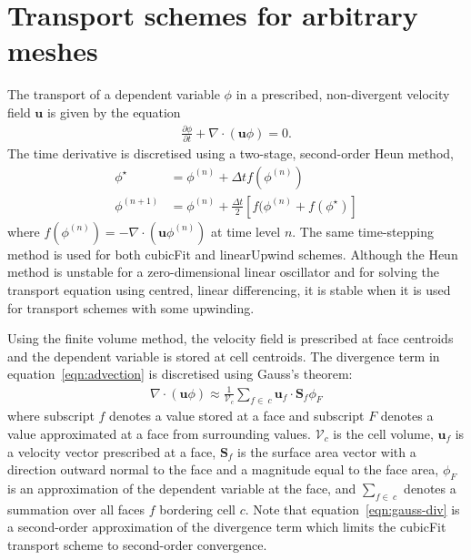 \section{Transport schemes for arbitrary meshes}
\label{sec:transport}
The transport of a dependent variable $\phi$ in a prescribed, non-divergent velocity field $\mathbf{u}$ is given by the equation		
\begin{align}		
	\frac{\partial \phi}{\partial t} + \nabla \cdot \left( \mathbf{u} \phi \right) = 0 \text{.} \label{eqn:advection}		
\end{align}
The time derivative is discretised using a two-stage, second-order Heun method,
\begin{subequations}
\begin{align}
	\phi^\star &= \phi^{(n)} + \Delta t f(\phi^{(n)}) \\
	\phi^{(n+1)} &= \phi^{(n)} + \frac{\Delta t}{2} \left[ f(\phi^{(n)} + f(\phi^{\star}) \right]
\end{align}
\end{subequations}
where \(f(\phi^{(n)}) = - \nabla \cdot (\mathbf{u} \phi^{(n)})\) at time level \(n\).  The same time-stepping method is used for both cubicFit and linearUpwind schemes.
Although the Heun method is unstable for a zero-dimensional linear oscillator \citep{durran2013} and for solving the transport equation using centred, linear differencing, it is stable when it is used for transport schemes with some upwinding.

Using the finite volume method, the velocity field is prescribed at face centroids and the dependent variable is stored at cell centroids.  The divergence term in equation~\eqref{eqn:advection} is discretised using Gauss's theorem:
\begin{align}
	\nabla \cdot \left( \mathbf{u} \phi \right) \approx \frac{1}{\mathcal{V}_c} \sum_{f \in\:c} \mathbf{u}_f \cdot \mathbf{S}_f \phi_F \label{eqn:gauss-div}
\end{align}
where subscript $f$ denotes a value stored at a face and subscript $F$ denotes a value approximated at a face from surrounding values.  $\mathcal{V}_c$ is the cell volume, $\mathbf{u}_f$ is a velocity vector prescribed at a face, ${\mathbf{S}_f}$ is the surface area vector with a direction outward normal to the face and a magnitude equal to the face area, $\phi_F$ is an approximation of the dependent variable at the face, and $\sum_{f \in\:c}$ denotes a summation over all faces $f$ bordering cell $c$.
Note that equation~\eqref{eqn:gauss-div} is a second-order approximation of the divergence term which limits the cubicFit transport scheme to second-order convergence.

